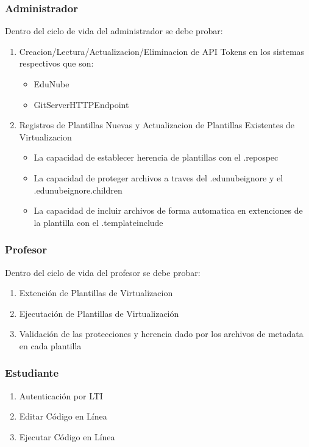 \subsubsection{Administrador}
Dentro del ciclo de vida del administrador se debe probar:
\begin{enumerate}
  \item Creacion/Lectura/Actualizacion/Eliminacion de API Tokens en los sistemas respectivos que son:
  \begin{itemize}
    \item EduNube
    \item GitServerHTTPEndpoint
  \end{itemize}
  \item Registros de Plantillas Nuevas y Actualizacion de Plantillas Existentes de Virtualizacion
  \begin{itemize}
    \item La capacidad de establecer herencia de plantillas con el .repospec
    \item La capacidad de proteger archivos a traves del  .edunubeignore y el .edunubeignore.children
    \item La capacidad de incluir archivos de forma automatica en extenciones de la plantilla con el .templateinclude
  \end{itemize}
\end{enumerate}

\subsubsection{Profesor}
Dentro del ciclo de vida del profesor se debe probar:
\begin{enumerate}
  \item Extención de Plantillas de Virtualizacion
  \item Ejecutación de Plantillas de Virtualización
  \item Validación de las protecciones y herencia dado por los archivos de metadata en cada plantilla
\end{enumerate}

\subsubsection{Estudiante}
\begin{enumerate}
  \item Autenticación por LTI
  \item Editar Código en Línea
  \item Ejecutar Código en Línea
\end{enumerate}

